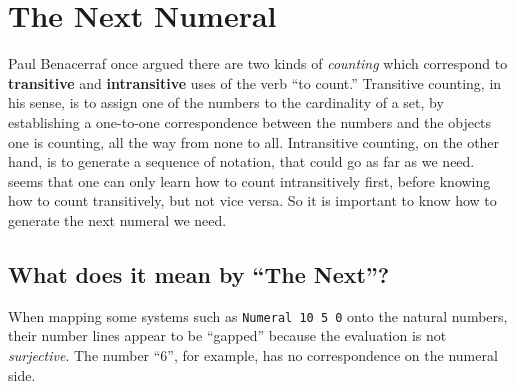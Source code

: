 \documentclass[\main/thesis.tex]{subfiles}
\begin{document}
\section{The Next Numeral}\label{next}

Paul Benacerraf once argued\cite{benacerraf1965numbers} 
there are two kinds of \textit{counting} which correspond to \textbf{transitive}
and \textbf{intransitive} uses of the verb ``to count.''
Transitive counting, in his sense, is to assign one of the numbers to the
cardinality of a set,
by establishing a one-to-one correspondence between the numbers and the objects
one is counting, all the way from none to all.
Intransitive counting, on the other hand, is to generate a sequence of notation,
that could go as far as we need.
 seems that one can only learn how to count intransitively first,
before knowing how to count transitively, but not vice versa.
So it is important to know how to generate the next numeral we need.

\subsection{What does it mean by ``The Next''?}

When mapping some systems such as {\lstinline|Numeral 10 5 0|} onto the natural
numbers, their number lines appear to be ``gapped'' because the evaluation is
not \textit{surjective}.
The number ``6'', for example, has no correspondence on the numeral side.

\begin{center}
    \begin{adjustbox}{max width=\textwidth}
    \end{adjustbox}
\end{center}
\end{document}
